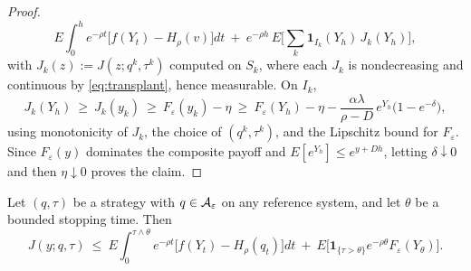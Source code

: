 \begin{proof}
\[
E\int_0^h e^{-\rho t}\big[f(Y_t)-H_\rho(v)\big]dt\ +\ e^{-\rho h}\,E\Big[\sum_k\mathbf 1_{I_k}(Y_h)\,J_k(Y_h)\Big],
\]
with $J_k(z):=J(z;q^k,\tau^k)$ computed on $S_k$,
where each $J_k$ is nondecreasing and continuous by \eqref{eq:transplant}, hence measurable. On $I_k$,
\[
J_k(Y_h)\ \ge\ J_k(y_k)\ \ge\ F_\varepsilon(y_k)-\eta\ \ge\ F_\varepsilon(Y_h)-\eta-\frac{\alpha\lambda}{\rho-D}\,e^{Y_h}\big(1-e^{-\delta}\big),
\]
using monotonicity of $J_k$, the choice of $(q^k,\tau^k)$, and the Lipschitz bound for $F_\varepsilon$. Since $F_\varepsilon(y)$ dominates the composite payoff and $E[e^{Y_h}]\le e^{y+Dh}$, letting $\delta\downarrow0$ and then $\eta\downarrow0$ proves the claim.
\end{proof}

\begin{alemma}[Conditioning]\label{lem:cond}
Let $(q,\tau)$ be a strategy with $q\in\mathcal{A}_\varepsilon$ on any reference system, and let $\theta$ be a bounded stopping time. Then
\[
J(y;q,\tau)\ \le\ E\int_0^{\tau\wedge\theta}e^{-\rho t}\big[f(Y_t)-H_\rho(q_t)\big]dt\ +\ E\big[\mathbf 1_{\{\tau>\theta\}}e^{-\rho\theta}F_\varepsilon(Y_\theta)\big].
\]
\end{alemma}

